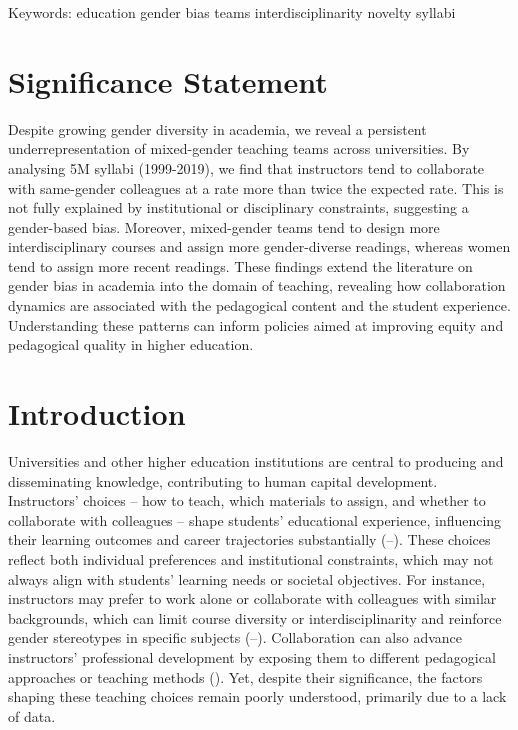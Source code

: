 \documentclass[
  british,
  12pt, %
]{article}
\begin{document}
Keywords: education \textbar{} gender bias \textbar{} teams \textbar{} interdisciplinarity \textbar{} novelty \textbar{} syllabi

\newpage

\section*{Significance Statement}\label{significance-statement}

Despite growing gender diversity in academia, we reveal a persistent underrepresentation of mixed-gender teaching teams across universities. By analysing 5M syllabi (1999-2019), we find that instructors tend to collaborate with same-gender colleagues at a rate more than twice the expected rate. This is not fully explained by institutional or disciplinary constraints, suggesting a gender-based bias. Moreover, mixed-gender teams tend to design more interdisciplinary courses and assign more gender-diverse readings, whereas women tend to assign more recent readings. These findings extend the literature on gender bias in academia into the domain of teaching, revealing how collaboration dynamics are associated with the pedagogical content and the student experience. Understanding these patterns can inform policies aimed at improving equity and pedagogical quality in higher education.

\section{Introduction}\label{introduction}

Universities and other higher education institutions are central to producing and disseminating knowledge, contributing to human capital development. Instructors' choices -- how to teach, which materials to assign, and whether to collaborate with colleagues -- shape students' educational experience, influencing their learning outcomes and career trajectories substantially (--). These choices reflect both individual preferences and institutional constraints, which may not always align with students' learning needs or societal objectives. For instance, instructors may prefer to work alone or collaborate with colleagues with similar backgrounds, which can limit course diversity or interdisciplinarity and reinforce gender stereotypes in specific subjects (--). Collaboration can also advance instructors' professional development by exposing them to different pedagogical approaches or teaching methods (). Yet, despite their significance, the factors shaping these teaching choices remain poorly understood, primarily due to a lack of data.
\end{document}
